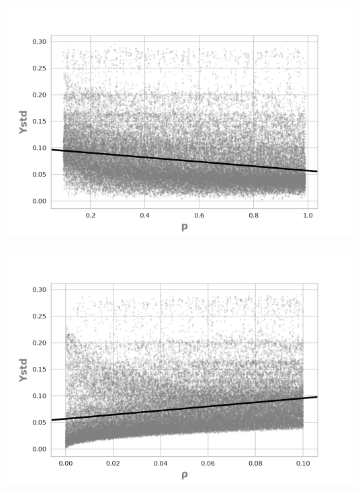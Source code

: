 \begin{figure}[H]
    \begin{subfigure}[b]{0.49\textwidth}
        \includegraphics[width=\textwidth]{ims/mutoregressions/regressionmutatingop.png}
      \end{subfigure}
          \begin{subfigure}[b]{0.49\textwidth}
            \includegraphics[width=\textwidth]{ims/mutoregressions/regressionmutatingorho.png}
      \end{subfigure}


\end{figure}
